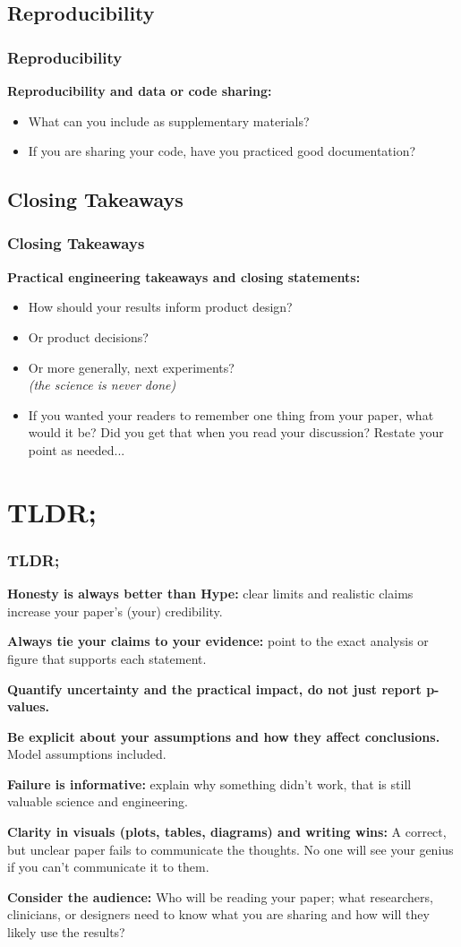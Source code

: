 \documentclass[aspectratio=169]{beamer} %
\begin{document}
	\subsection{Reproducibility}
	\begin{frame}
	\frametitle{Reproducibility}
		{\bf Reproducibility and data or code sharing:} 
		\begin{itemize}
			\item What can you include as supplementary materials?
			\item If you are sharing your code, have you practiced good documentation?
		\end{itemize}
	\end{frame}

	\subsection{Closing Takeaways}
	\begin{frame}
	\frametitle{Closing Takeaways}
		{\bf Practical engineering takeaways and closing statements:} 
		\begin{itemize}
			\item How should your results inform product design?
			\item Or product decisions?
			\item Or more generally, next experiments?\\{\em (the science is never done)}
			\item If you wanted your readers to remember one thing from your paper, what would it be?  Did you get that when you read your discussion?  Restate your point as needed...
		\end{itemize}
	\end{frame}

\section{TLDR;}
	\begin{frame}
		\frametitle{TLDR;}
			{\bf Honesty is always better than Hype:} clear limits and realistic claims increase your paper's (your) credibility.

			{\bf Always tie your claims to your evidence:} point to the exact analysis or figure that supports each statement.

			{\bf Quantify uncertainty and the practical impact, do not just report p-values.}

			{\bf Be explicit about your assumptions and how they affect conclusions.} Model assumptions included.

			{\bf Failure is informative:} explain why something didn't work, that is still valuable science and engineering.

			{\bf Clarity in visuals (plots, tables, diagrams) and writing wins:} A correct, but unclear paper fails to communicate the thoughts.  No one will see your genius if you can't communicate it to them.

			{\bf Consider the audience:} Who will be reading your paper; what researchers, clinicians, or designers need to know what you are sharing and how will they likely use the results?
	\end{frame}
\end{document}
